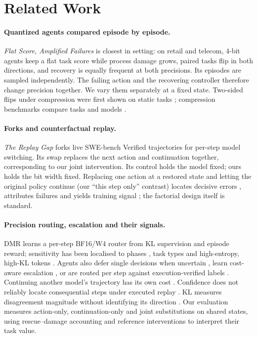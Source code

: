 \section{Related Work}
\label{sec:related}

\paragraph{Quantized agents compared episode by episode.} \emph{Flat Score, Amplified Failures} \citep{jang2026flat} is closest in setting: on \tautwo{} retail and telecom, 4-bit agents keep a flat task score while process damage grows, paired tasks flip in both directions, and recovery is equally frequent at both precisions. %
Its episodes are sampled independently. The failing action and the recovering controller therefore change precision together. We vary them separately at a fixed state. Two-sided flips under compression were first shown on static tasks \citep{dutta2024accuracy}; compression benchmarks compare tasks and models \citep{dong2025acbench}.

\paragraph{Forks and counterfactual replay.} \emph{The Replay Gap} \citep{gonuguntla2026replay} forks live SWE-bench Verified trajectories for per-step model switching. Its swap replaces the next action and continuation together, corresponding to our joint intervention. Its control holds the model fixed; ours holds the bit width fixed. %
Replacing one action at a restored state and letting the original policy continue (our ``this step only'' contrast) locates decisive errors \citep{zhang2025agentracer}, attributes failures \citep{shah2026car} and yields training signal \citep{li2026cso,li2026crr}; the factorial design itself is standard. %

\paragraph{Precision routing, escalation and their signals.} DMR \citep{li2026dynamicmp} learns a per-step BF16/W4 router from KL supervision and episode reward; sensitivity has been localised to phases \citep{lu2026mixquant}, task types \citep{zhang2026quantclaw} and high-entropy, high-KL tokens \citep{lotfi2026quantized}. Agents also defer single decisions when uncertain \citep{piatrashyn2026redact}, learn cost-aware escalation \citep{lei2026tacit}, or are routed per step against execution-verified labels \citep{yang2026twinrouterbench}. Continuing another model's trajectory has its own cost \citep{ganz2026handoff}. Confidence does not reliably locate consequential steps under executed replay \citep{zhang2026credit}. KL measures disagreement magnitude without identifying its direction \citep{nikolic2026displacement}. Our evaluation measures action-only, continuation-only and joint substitutions on shared states, using rescue--damage accounting and reference interventions to interpret their task value.

